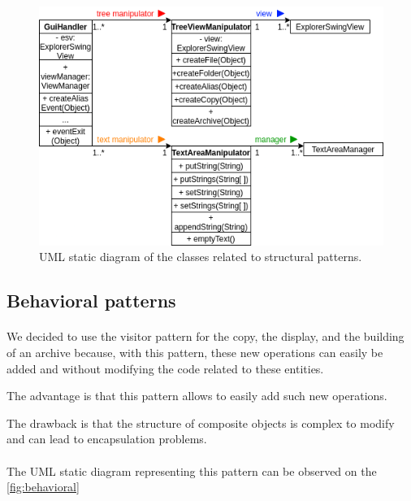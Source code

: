 \documentclass[a4paper, 11pt, oneside]{article}
\begin{document}
\begin{figure}[H]
    \centering
    \includegraphics[scale=0.6]{structural.png}
    \caption{UML static diagram of the classes related to structural patterns.}\label{fig:structural}
\end{figure}

\subsection{Behavioral patterns}

\paragraph{}We decided to use the visitor pattern for the copy, the display, and the building of an archive because, with this pattern, these new operations can easily be added and without modifying the code related to these entities.

The advantage is that this pattern allows to easily add such new operations.

The drawback is that the structure of composite objects is complex to modify and can lead to encapsulation problems.

\paragraph{}The UML static diagram representing this pattern can be observed on the \autoref{fig:behavioral}
\end{document}

